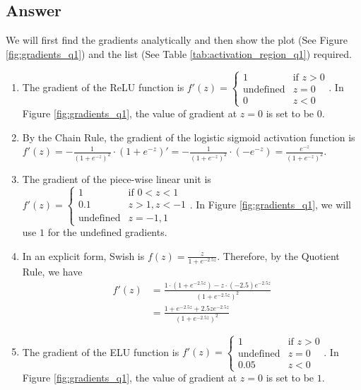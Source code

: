 \documentclass[
	12pt, %
]{../Template/fphw}
\begin{document}

\subsection*{Answer}
We will first find the gradients analytically and then show the plot (See Figure \ref{fig:gradients_q1}) and the list (See Table \ref{tab:activation_region_q1}) required.

\begin{enumerate}[label = (\arabic*)]
\item The gradient of the ReLU function is \( f'(z) = \begin{cases} 1 & \text{if } z > 0 \\ \text{undefined} & z=0\\ 0 & z<0 \end{cases}\). In Figure \ref{fig:gradients_q1}, the value of gradient at $z=0$ is set to be $0$.  
\item By the Chain Rule, the gradient of the logistic sigmoid activation function is $f'(z) = -\frac{1}{(1+e^{-z})^2}\cdot (1+e^{-z})' = -\frac{1}{(1+e^{-z})^2} \cdot (-e^{-z}) = \frac{e^{-z}}{(1+e^{-z})^2}$.
\item The gradient of the piece-wise linear unit is \( f'(z) = \begin{cases} 1 & \text{if } 0<z<1 \\ 0.1 & z>1, z<-1 \\ \text{undefined} & z=-1,1 \end{cases}\). In Figure \ref{fig:gradients_q1}, we will use $1$ for the undefined gradients.
\item In an explicit form, Swish is $f(z) =\frac{z}{1+e^{-2.5z}}$. Therefore, by the Quotient Rule, we have 
\begin{align*}f'(z) &= \frac{1\cdot (1+e^{-2.5z})-z\cdot (-2.5)e^{-2.5z}}{(1+e^{-2.5z})^2} \\ &= \frac{1+e^{-2.5z}+2.5ze^{-2.5z}}{(1+e^{-2.5z})^2}\end{align*}
\item The gradient of the ELU function is \( f'(z) = \begin{cases} 1 & \text{if } z > 0 \\ \text{undefined} & z=0\\ 0.05 & z<0 \end{cases}\). In Figure \ref{fig:gradients_q1}, the value of gradient at $z=0$ is set to be $1$. 

\end{enumerate}
\end{document}
